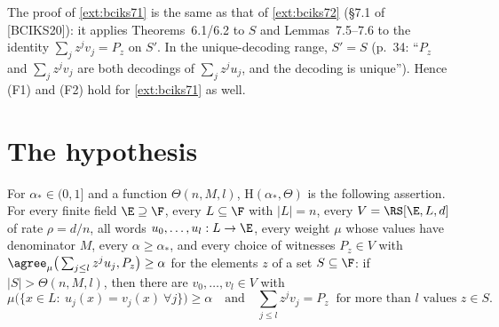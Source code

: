\begin{remark}\label{ext:facts71}
The proof of \ref{ext:bciks71} is the same as that of \ref{ext:bciks72} (\S7.1 of
[BCIKS20]): it applies Theorems~6.1/6.2 to $S$ and Lemmas~7.5--7.6 to the identity
$\sum_jz^jv_j=P_z$ on $S'$. In the unique-decoding range, $S'=S$ (p.~34: ``$P_z$ and
$\sum_jz^jv_j$ are both decodings of $\sum_jz^ju_j$, and the decoding is unique'').
Hence (F1) and (F2) hold for \ref{ext:bciks71} as well.
\end{remark}

\section{The hypothesis}

\begin{hypothesis}\label{hyp:ca}
For $\alpha_*\in(0,1]$ and a function $\Theta(n,M,l)$, $\mathrm H(\alpha_*,\Theta)$ is the
following assertion. For every finite field $\E\supseteq\F$, every $L\subseteq\F$ with
$|L|=n$, every $V=\RS[\E,L,d]$ of rate $\rho=d/n$, all words $u_0,\dots,u_l:L\to\E$, every
weight $\mu$ whose values have denominator $M$, every $\alpha\ge\alpha_*$, and every choice of
witnesses $P_z\in V$ with $\agree_\mu\big(\sum_{j\le l}z^ju_j,P_z\big)\ge\alpha$ for the
elements $z$ of a set $S\subseteq\F$: if $|S|>\Theta(n,M,l)$, then there are $v_0,\dots,v_l\in V$
with
\[
\mu\big(\{x\in L:\ u_j(x)=v_j(x)\ \forall j\}\big)\ge\alpha
\quad\text{and}\quad
\textstyle\sum_{j\le l}z^jv_j=P_z\ \text{ for more than }l\text{ values }z\in S .
\]
\end{hypothesis}

